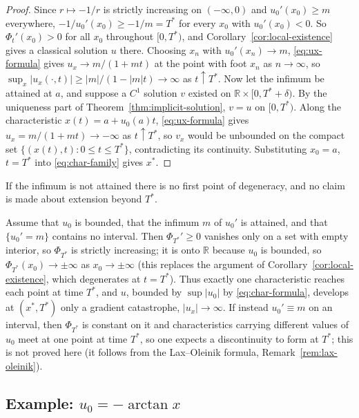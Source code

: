 \begin{proof}
Since $r \mapsto -1/r$ is strictly increasing on $(-\infty,0)$ and
$u_0'(x_0) \geq m$ everywhere, $-1/u_0'(x_0) \geq -1/m = T^*$ for every
$x_0$ with $u_0'(x_0)<0$. So $\Phi_t'(x_0)>0$ for all $x_0$ throughout
$[0,T^*)$, and Corollary~\ref{cor:local-existence} gives a classical solution
$u$ there. Choosing $x_n$ with $u_0'(x_n)\to m$, \eqref{eq:ux-formula} gives
$u_x\to m/(1+mt)$ at the point with foot $x_n$ as $n\to\infty$, so
$\sup_x|u_x(\cdot,t)|\ge|m|/(1-|m|t)\to\infty$ as $t\uparrow T^*$. Now let the
infimum be attained at $a$, and suppose a $C^1$ solution $v$ existed on $\mathbb{R}\times[0,T^*+\delta)$. By the
uniqueness part of Theorem~\ref{thm:implicit-solution}, $v=u$ on
$[0,T^*)$. Along the characteristic $x(t)=a+u_0(a)t$,
\eqref{eq:ux-formula} gives $u_x=m/(1+mt)\to-\infty$ as $t\uparrow T^*$, so
$v_x$ would be unbounded on the compact set $\{(x(t),t):0\le t\le T^*\}$,
contradicting its continuity. Substituting $x_0=a$, $t=T^*$ into
\eqref{eq:char-family} gives $x^*$.
\end{proof}

If the infimum is not attained there is no first point of degeneracy, and no
claim is made about extension beyond $T^*$.

\begin{remark}
\label{rem:singularity-vs-shock}
Assume that $u_0$ is bounded, that the infimum $m$ of $u_0'$ is attained, and
that $\{u_0'=m\}$ contains no interval. Then $\Phi_{T^*}'\ge0$ vanishes only on a
set with empty interior, so $\Phi_{T^*}$ is strictly increasing; it is onto
$\mathbb{R}$ because $u_0$ is bounded, so $\Phi_{T^*}(x_0)\to\pm\infty$ as
$x_0\to\pm\infty$ (this replaces the argument of
Corollary~\ref{cor:local-existence}, which degenerates at $t=T^*$). Thus exactly
one characteristic reaches each point at time $T^*$, and $u$, bounded by
$\sup|u_0|$ by \eqref{eq:char-formula}, develops at $(x^*,T^*)$ only a gradient
catastrophe, $|u_x|\to\infty$. If instead $u_0'\equiv m$ on an interval, then
$\Phi_{T^*}$ is constant on it and characteristics carrying different values of
$u_0$ meet at one point at time $T^*$, so one expects a discontinuity to form
at $T^*$; this is not proved here (it follows from the Lax--Oleinik formula,
Remark~\ref{rem:lax-oleinik}).
\end{remark}

\subsection{Example: $u_0=-\arctan x$}
\label{subsec:arctan-breakdown}

